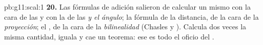 \begin{solution}{pb:g11:scal:1}
\textbf{20.} Las fórmulas de adición salieron de calcular un mismo
 con la cara de las \emph{} y con la de las
\emph{ y el ángulo}; la fórmula de la distancia, de la cara de la
\emph{proyección}; el , de la cara de la \emph{bilinealidad}
(Chasles y ). Calcula dos veces la misma cantidad, iguala y
cae un teorema: ese es todo el oficio del .
\end{solution}
